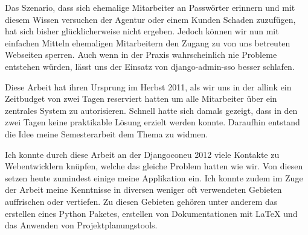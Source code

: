 Das Szenario, dass sich ehemalige Mitarbeiter an Passwörter erinnern und mit diesem Wissen versuchen der Agentur oder einem Kunden Schaden zuzufügen, hat sich bisher glücklicherweise nicht ergeben. Jedoch können wir nun mit einfachen Mitteln ehemaligen Mitarbeitern den Zugang zu  von uns betreuten Webseiten sperren. Auch wenn in der Praxis wahrscheinlich nie Probleme entstehen würden, lässt uns der Einsatz von django-admin-sso besser schlafen.

Diese Arbeit hat ihren Ursprung im Herbst 2011, als wir uns in der allink ein Zeitbudget von zwei Tagen reserviert hatten um alle Mitarbeiter über ein zentrales System zu autorisieren. Schnell hatte sich damals gezeigt, dass in den zwei Tagen keine praktikable Lösung erzielt werden konnte. Daraufhin entstand die Idee meine Semesterarbeit dem Thema zu widmen.

Ich konnte durch diese Arbeit an der Djangoconeu 2012 viele Kontakte zu Webentwicklern knüpfen, welche das gleiche Problem hatten wie wir. Von diesen setzen heute zumindest einige meine Applikation ein. Ich konnte zudem im Zuge der Arbeit meine Kenntnisse in diversen weniger oft verwendeten Gebieten auffrischen oder vertiefen. Zu diesen Gebieten gehören unter anderem das erstellen eines Python Paketes, erstellen von Dokumentationen mit LaTeX und das Anwenden von Projektplanungstools.